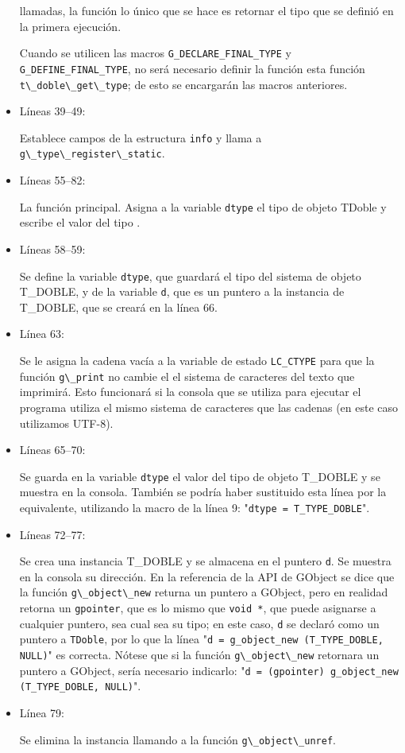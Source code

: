 \begin{itemize}
  llamadas, la función lo único que se hace es retornar el tipo que se definió en la primera ejecución.\par
  Cuando se utilicen las macros \texttt{G\_DECLARE\_FINAL\_TYPE} y \texttt{G\_DEFINE\_FINAL\_TYPE}, no será
  necesario definir la función esta función \passthrough{\lstinline!t\_doble\_get\_type!}; de esto se encargarán las macros anteriores.
\item Líneas 39--49:\par
  Establece campos de la estructura \texttt{info} y llama a \passthrough{\lstinline!g\_type\_register\_static!}.
\item Líneas 55--82:\par
  La función principal. Asigna a la variable \texttt{dtype} el tipo de objeto \textsf{TDoble} y escribe el valor
  del tipo .
\item Líneas 58--59:\par
  Se define la variable \texttt{dtype}, que guardará el tipo del sistema de objeto \textsf{T\_DOBLE}, y de la
  variable \texttt{d}, que es un puntero a la instancia de \textsf{T\_DOBLE}, que se creará en la línea 66.
\item Línea 63:\par
  Se le asigna la cadena vacía a la variable de estado \texttt{LC\_CTYPE} para que la función
  \passthrough{\lstinline!g\_print!} no cambie el el sistema de caracteres del texto que imprimirá.
  Esto funcionará si la consola que se utiliza para ejecutar el programa utiliza el mismo sistema de caracteres
  que las cadenas (en este caso utilizamos UTF-8).
\item Líneas 65--70:\par
  Se guarda en la variable \texttt{dtype} el valor del tipo de objeto \textsf{T\_DOBLE} y se muestra en la consola.
  También se podría haber sustituido esta línea por la equivalente, utilizando la macro de la línea 9:
  "\texttt{dtype = T\_TYPE\_DOBLE}".
\item Líneas 72--77:\par
  Se crea una instancia \textsf{T\_DOBLE} y se almacena en el puntero \texttt{d}. Se muestra en la consola su
  dirección. En la referencia de la API de \textsf{GObject} se dice que la función
  \passthrough{\lstinline!g\_object\_new!} returna un puntero a \textsf{GObject}, pero en realidad retorna un
  \texttt{gpointer}, que es lo mismo que \texttt{void *}, que puede asignarse a cualquier puntero, sea cual sea
  su tipo; en este caso, \texttt{d} se declaró como un puntero a \texttt{TDoble}, por lo que la línea
  "\texttt{d = g\_object\_new (T\_TYPE\_DOBLE, NULL)}" es correcta. Nótese que si la función
  \passthrough{\lstinline!g\_object\_new!} retornara un puntero a \textsf{GObject}, sería necesario indicarlo:
  "\texttt{d = (gpointer) g\_object\_new (T\_TYPE\_DOBLE, NULL)}".
\item Línea 79:\par
  Se elimina la instancia llamando a la función \passthrough{\lstinline!g\_object\_unref!}.
\end{itemize}


